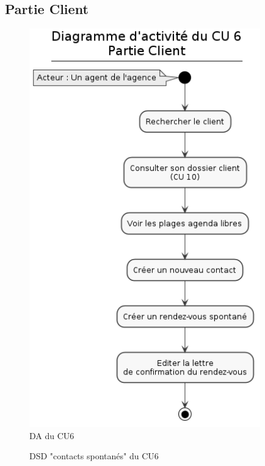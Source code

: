 \subsection{Partie Client}
\begin{figure}[H]
\centering
\includegraphics[width=10cm]{figures/DA_CU6_partieClient.png}
\caption{DA du CU6}
\end{figure}

\begin{figure}[H]
\noindent{}
\caption{DSD "contacts spontanés" du CU6}
\end{figure}

